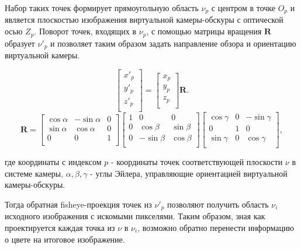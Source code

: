Набор таких точек формирует прямоугольную область $\nu_p$ с центром в точке $O_p$ и является плоскостью изображения
 виртуальной камеры-обскуры  с оптической осью $Z_p$. Поворот точек, входящих в $\nu_p$, с помощью матрицы вращения 
 $\bm{R}$ образует $\nu'_p$ и позволяет таким образом задать направление обзора и ориентацию виртуальной камеры. 
\begin{eqseries}
    \begin{equation}
        \label{eq:sweeped}
        \left[\begin{matrix}x'_p\\y'_p\\z'_p\\\end{matrix}\right] = \left[\begin{matrix}x_p\\y_p\\z_p\\\end{matrix}\right] \bm{R}.
    \end{equation}  
    \begin{equation}
        \label{eq:R}
        \bm{R} = \left[\begin{matrix}\cos{\alpha}&-\sin{\alpha}&0\\\sin{\alpha}&\cos{\alpha}&0\\0&0&1\\\end{matrix}\right]\left[\begin{matrix}1&0&0\\0&\cos{\beta}&\sin{\beta}\\0&-\sin{\beta}&\cos{\beta}\\\end{matrix}\right]\left[\begin{matrix}\cos{\gamma}&0&-\sin{\gamma}\\0&1&0\\\sin{\gamma}&0&\cos{\gamma}\\\end{matrix}\right],
    \end{equation} 
\end{eqseries}

\noindent где координаты с индексом $p$ -  координаты точек соответствующей плоскости $\nu$ в системе камеры, $\alpha, \beta, \gamma$ - углы Эйлера, управляющие  ориентацией виртуальной камеры-обскуры. %

Тогда обратная fisheye-проекция точек из $\nu'_p$ позволяют получить область $\nu_i$ исходного изображения с искомыми пикселями. 
Таким образом, зная как  проектируется каждая точка из $\nu$ в $\nu_i$, возможно  обратно перенести информацию о цвете на итоговое изображение.  

